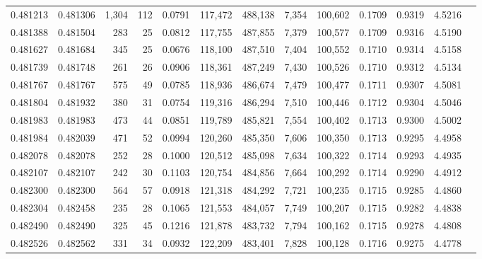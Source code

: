 \begin{tabular}{rrrrrrrrrrrrr}
0.481213 & 0.481306 & 1,304 &   112 &                                     0.0791 & 117,472 & 488,138 &   7,354 & 100,602 & 0.1709 & 0.9319 & 4.5216 \\
0.481388 & 0.481504 &   283 &    25 &                                     0.0812 & 117,755 & 487,855 &   7,379 & 100,577 & 0.1709 & 0.9316 & 4.5190 \\
0.481627 & 0.481684 &   345 &    25 &                                     0.0676 & 118,100 & 487,510 &   7,404 & 100,552 & 0.1710 & 0.9314 & 4.5158 \\
0.481739 & 0.481748 &   261 &    26 &                                     0.0906 & 118,361 & 487,249 &   7,430 & 100,526 & 0.1710 & 0.9312 & 4.5134 \\
0.481767 & 0.481767 &   575 &    49 &                                     0.0785 & 118,936 & 486,674 &   7,479 & 100,477 & 0.1711 & 0.9307 & 4.5081 \\
0.481804 & 0.481932 &   380 &    31 &                                     0.0754 & 119,316 & 486,294 &   7,510 & 100,446 & 0.1712 & 0.9304 & 4.5046 \\
0.481983 & 0.481983 &   473 &    44 &                                     0.0851 & 119,789 & 485,821 &   7,554 & 100,402 & 0.1713 & 0.9300 & 4.5002 \\
0.481984 & 0.482039 &   471 &    52 &                                     0.0994 & 120,260 & 485,350 &   7,606 & 100,350 & 0.1713 & 0.9295 & 4.4958 \\
0.482078 & 0.482078 &   252 &    28 &                                     0.1000 & 120,512 & 485,098 &   7,634 & 100,322 & 0.1714 & 0.9293 & 4.4935 \\
0.482107 & 0.482107 &   242 &    30 &                                     0.1103 & 120,754 & 484,856 &   7,664 & 100,292 & 0.1714 & 0.9290 & 4.4912 \\
0.482300 & 0.482300 &   564 &    57 &                                     0.0918 & 121,318 & 484,292 &   7,721 & 100,235 & 0.1715 & 0.9285 & 4.4860 \\
0.482304 & 0.482458 &   235 &    28 &                                     0.1065 & 121,553 & 484,057 &   7,749 & 100,207 & 0.1715 & 0.9282 & 4.4838 \\
0.482490 & 0.482490 &   325 &    45 &                                     0.1216 & 121,878 & 483,732 &   7,794 & 100,162 & 0.1715 & 0.9278 & 4.4808 \\
0.482526 & 0.482562 &   331 &    34 &                                     0.0932 & 122,209 & 483,401 &   7,828 & 100,128 & 0.1716 & 0.9275 & 4.4778 \\

\end{tabular}
